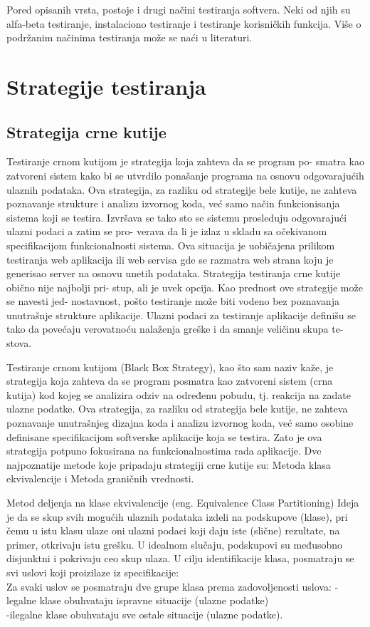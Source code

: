 \documentclass[12pt,oneside]{memoir}
\begin{document}
Pored opisanih vrsta, postoje i drugi načini testiranja softvera. Neki od njih su alfa-beta testiranje, instalaciono testiranje i testiranje korisničkih funkcija. Više o podržanim načinima testiranja može se naći u literaturi.

\section{Strategije testiranja} \label{broj3}
\subsection{Strategija crne kutije}
Testiranje crnom kutijom je strategija koja zahteva da se program po-
smatra kao zatvoreni sistem kako bi se utvrdilo ponašanje programa na
osnovu odgovarajućih ulaznih podataka. Ova strategija, za razliku od
strategije bele kutije, ne zahteva poznavanje strukture i analizu izvornog
koda, već samo način funkcionisanja sistema koji se testira. Izvršava se
tako sto se sistemu prosleduju odgovarajući ulazni podaci a zatim se pro-
verava da li je izlaz u skladu sa očekivanom specifikacijom funkcionalnosti
sistema. Ova situacija je uobičajena prilikom testiranja web aplikacija ili
web servisa gde se razmatra web strana koju je generisao server na osnovu
unetih podataka. Strategija testiranja crne kutije obično nije najbolji pri-
stup, ali je uvek opcija. Kao prednost ove strategije može se navesti jed-
nostavnost, pošto testiranje može biti vodeno bez poznavanja unutrašnje
strukture aplikacije. Ulazni podaci za testiranje aplikacije definišu se tako
da povećaju verovatnoću nalaženja greške i da smanje veličinu skupa te-
stova.
\par
Testiranje crnom kutijom (Black Box Strategy), kao što sam naziv kaže, je strategija koja zahteva da se program posmatra kao zatvoreni sistem (crna kutija) kod kojeg se analizira odziv  na  određenu  pobudu,  tj.  reakcija  na  zadate  ulazne  podatke.  Ova  strategija,  za razliku od strategija bele kutije, ne zahteva poznavanje unutrašnjeg dizajna koda i analizu izvornog koda, već samo 
osobine definisane specifikacijom softverske aplikacije koja se testira.
Zato je ova strategija potpuno fokusirana na funkcionalnostima rada aplikacije.
Dve najpoznatije metode koje pripadaju strategiji crne kutije su: Metoda klasa ekvivalencije i Metoda graničnih vrednosti.
\par 
Metod deljenja na klase ekvivalencije (eng. Equivalence Class Partitioning)
Ideja je da se skup svih mogućih ulaznih podataka izdeli na podskupove (klase), pri čemu u istu klasu ulaze oni ulazni podaci koji daju iste (slične) rezultate, na primer, otkrivaju istu grešku. U idealnom slučaju, podskupovi su međusobno disjunktni i pokrivaju ceo skup ulaza. U cilju identifikacije klasa, posmatraju se svi uslovi koji proizilaze iz specifikacije:
\\Za svaki uslov se posmatraju dve grupe klasa prema zadovoljenosti uslova:
-legalne klase obuhvataju ispravne situacije (ulazne podatke) \\
-ilegalne klase obuhvataju sve ostale situacije (ulazne podatke).
\end{document}

